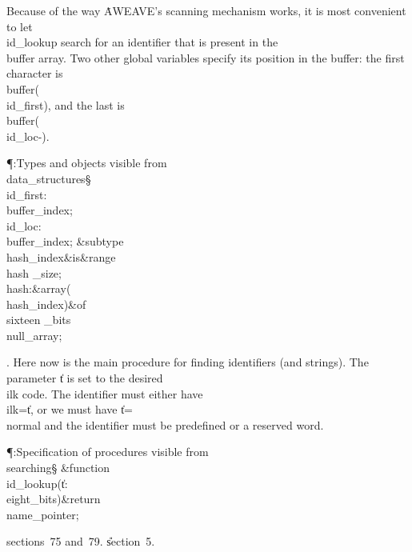 Because of the way \.{AWEAVE}'s scanning mechanism works, it is most convenient
to let \\{id\_lookup} search for an identifier that is present in the %
\\{buffer}
array. Two other global variables specify its position in the buffer: the
first character is \\{buffer}\?(\?\\{id\_first}\?)\?, and the last is %
\\{buffer}\?(\?\\{id\_loc}\?-\?)\?.

\Y\P\?\4:Types and objects visible from \\{data\_structures}\X\mathrel{+}\S%
\?\6
\\{id\_first}\?:\?\\{buffer\_index};\6
\\{id\_loc}\?:\?\\{buffer\_index};\7
\&{subtype}\8\\{hash\_index}\8\&{is}\8\8\&{range}\?\to\?\\{hash%
\_size};\6
\\{hash}\?:\1\&{array}\8\1(\?\\{hash\_index}\?\2)\2\8\&{of}\?\8\\{sixteen%
\_bits}\?\K\?\\{null\_array};\par
\fi

. Here now is the main procedure for finding identifiers (and strings).
The parameter \|t is set to the desired \\{ilk} code.
The identifier must either have \\{ilk}\?=\?\|t, or we must have \|t\?=\?%
\\{normal} and the
identifier must be predefined or a reserved word.

\Y\P\?\4:Specification of procedures visible from \\{searching}\X\S\?\6
\&{function}\8\1\\{id\_lookup}\?(\1\?\|t\?:\?\\{eight\_bits}\?\2)\&{return}\?\8%
\\{name\_pointer}\2;\par
\A sections~75 and~79.
\U section~5\*.\fi

